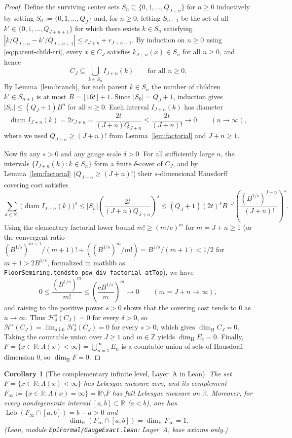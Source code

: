 \documentclass[11pt]{article}
\newtheorem{corollary}[theorem]{Corollary}
\theoremstyle{definition}
\theoremstyle{remark}
\newcommand{\R}{\mathbb{R}}
\newcommand{\Z}{\mathbb{Z}}
\newcommand{\ee}{\mathrm{e}}
\newcommand{\dimH}{\dim_{\mathrm{H}}}
\newcommand{\Lam}{\Lambda}
\begin{document}
\begin{proof}
Define the surviving center sets $S_n\subseteq\{0,1,\dots,Q_{J+n}\}$ for
$n\ge0$ inductively by setting $S_0:=\{0,1,\dots,Q_J\}$ and, for $n\ge0$,
letting $S_{n+1}$ be the set of all $k'\in\{0,1,\dots,Q_{J+n+1}\}$ for which
there exists $k\in S_n$ satisfying
$|k/Q_{J+n}-k'/Q_{J+n+1}|\le r_{J+n}+r_{J+n+1}$. By induction on $n\ge0$ using
\eqref{eq:parent-child-tri}, every $x\in C_J$ satisfies $k_{J+n}(x)\in S_n$ for
all $n\ge0$, and hence
\[
C_J\subseteq\bigcup_{k\in S_n} I_{J+n}(k)\qquad\text{for all }n\ge0.
\]
By Lemma~\ref{lem:branch}, for each parent $k\in S_n$ the number of children
$k'\in S_{n+1}$ is at most $B=\lfloor16t\rfloor+1$. Since $|S_0|=Q_J+1$,
induction gives $|S_n|\le(Q_J+1)B^n$ for all $n\ge0$. Each interval
$I_{J+n}(k)$ has diameter
\[
\operatorname{diam}I_{J+n}(k)=2r_{J+n}=\frac{2t}{(J+n)Q_{J+n}}
\le\frac{2t}{(J+n)!}\longrightarrow0\qquad(n\to\infty),
\]
where we used $Q_{J+n}\ge(J+n)!$ from Lemma~\ref{lem:factorial} and $J+n\ge1$.

Now fix any $s>0$ and any gauge scale $\delta>0$. For all sufficiently large
$n$, the intervals $\{I_{J+n}(k):k\in S_n\}$ form a finite $\delta$-cover of
$C_J$, and by Lemma~\ref{lem:factorial} ($Q_{J+n}\ge(J+n)!$) their $s$-dimensional
Hausdorff covering cost satisfies
\[
\sum_{k\in S_n}\bigl(\operatorname{diam}I_{J+n}(k)\bigr)^s
\le |S_n|\left(\frac{2t}{(J+n)Q_{J+n}}\right)^s
\le(Q_J+1)(2t)^s B^{-J}\left(\frac{(B^{1/s})^{J+n}}{(J+n)!}\right)^s.
\]
Using the elementary factorial lower bound $m!\ge(m/\ee)^m$ for $m=J+n\ge1$
(or the convergent ratio $(B^{1/s})^{m+1}/(m+1)!\div((B^{1/s})^m/m!)=B^{1/s}/(m+1)<1/2$
for $m+1>2B^{1/s}$, formalized in mathlib as
\texttt{FloorSemiring.tendsto\_pow\_div\_factorial\_atTop}), we have
\[
0\le\frac{(B^{1/s})^m}{m!}\le\left(\frac{\ee B^{1/s}}{m}\right)^m\longrightarrow0
\qquad(m=J+n\to\infty),
\]
and raising to the positive power $s>0$ shows that the covering cost tends to
$0$ as $n\to\infty$. Thus $\mathcal H_\delta^s(C_J)=0$ for every $\delta>0$,
so $\mathcal H^s(C_J)=\lim_{\delta\downarrow0}\mathcal H_\delta^s(C_J)=0$ for
every $s>0$, which gives $\dimH C_J=0$. Taking the countable union over
$J\ge1$ and $m\in\Z$ yields $\dimH E_c=0$. Finally,
$F=\{x\in\R:\Lam(x)<\infty\}=\bigcup_{n=1}^\infty E_n$ is a countable union of
sets of Hausdorff dimension $0$, so $\dimH F=0$.
\end{proof}

\begin{corollary}[The complementary infinite level, Layer~A in Lean]\label{cor:infinite-level}
The set $F=\{x\in\R:\Lam(x)<\infty\}$ has Lebesgue measure zero, and its
complement $F_\infty:=\{x\in\R:\Lam(x)=\infty\}=\R\setminus F$ has full
Lebesgue measure on $\R$. Moreover, for every nondegenerate interval
$[a,b]\subset\R$ ($a<b$), one has
$\operatorname{Leb}(F_\infty\cap[a,b])=b-a>0$ and
\[
\dimH(F_\infty\cap[a,b])=\dimH F_\infty=1.
\]
(Lean, module \texttt{EpiFormal/\allowbreak GaugeExact.lean}: Layer~A, base axioms only.)
\end{corollary}
\end{document}
